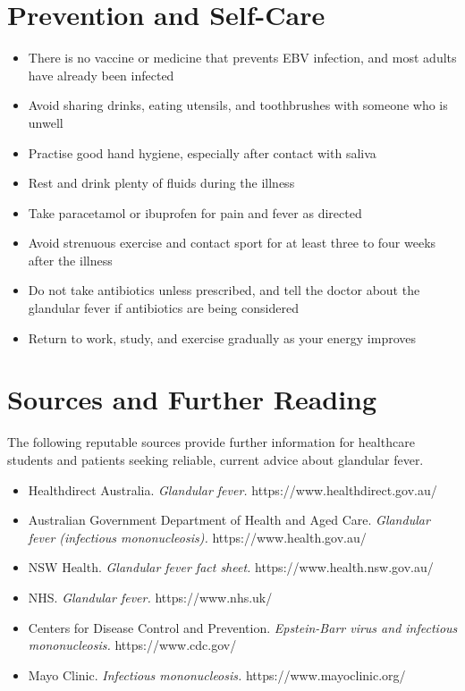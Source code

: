 \section*{Prevention and Self-Care}
\begin{itemize}
    \item There is no vaccine or medicine that prevents EBV infection, and most adults have already been infected
    \item Avoid sharing drinks, eating utensils, and toothbrushes with someone who is unwell
    \item Practise good hand hygiene, especially after contact with saliva
    \item Rest and drink plenty of fluids during the illness
    \item Take paracetamol or ibuprofen for pain and fever as directed
    \item Avoid strenuous exercise and contact sport for at least three to four weeks after the illness
    \item Do not take antibiotics unless prescribed, and tell the doctor about the glandular fever if antibiotics are being considered
    \item Return to work, study, and exercise gradually as your energy improves
\end{itemize}

\section*{Sources and Further Reading}
The following reputable sources provide further information for healthcare students and patients seeking reliable, current advice about glandular fever.

\begin{itemize}
    \item Healthdirect Australia. \textit{Glandular fever.} https://www.healthdirect.gov.au/
    \item Australian Government Department of Health and Aged Care. \textit{Glandular fever (infectious mononucleosis).} https://www.health.gov.au/
    \item NSW Health. \textit{Glandular fever fact sheet.} https://www.health.nsw.gov.au/
    \item NHS. \textit{Glandular fever.} https://www.nhs.uk/
    \item Centers for Disease Control and Prevention. \textit{Epstein-Barr virus and infectious mononucleosis.} https://www.cdc.gov/
    \item Mayo Clinic. \textit{Infectious mononucleosis.} https://www.mayoclinic.org/
\end{itemize}
